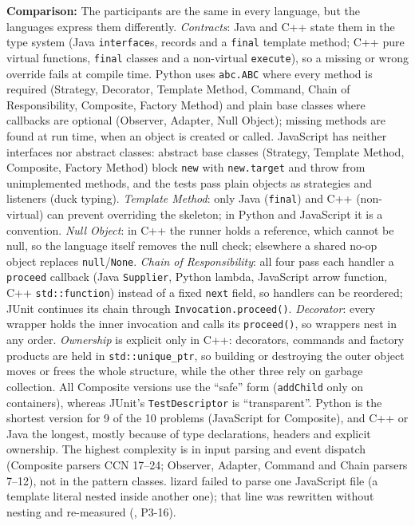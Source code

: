 \documentclass[11pt,a4paper]{article}
\newcommand{\entry}[1]{\textbf{#1:} }
\begin{document}
\entry{Comparison}The participants are the same in every language, but the languages express them differently. \emph{Contracts}: Java and C++ state them in the type system (Java \texttt{interface}s, records and a \texttt{final} template method; C++ pure virtual functions, \texttt{final} classes and a non-virtual \texttt{execute}), so a missing or wrong override fails at compile time. Python uses \texttt{abc.ABC} where every method is required (Strategy, Decorator, Template Method, Command, Chain of Responsibility, Composite, Factory Method) and plain base classes where callbacks are optional (Observer, Adapter, Null Object); missing methods are found at run time, when an object is created or called. JavaScript has neither interfaces nor abstract classes: abstract base classes (Strategy, Template Method, Composite, Factory Method) block \texttt{new} with \texttt{new.target} and throw from unimplemented methods, and the tests pass plain objects as strategies and listeners (duck typing). \emph{Template Method}: only Java (\texttt{final}) and C++ (non-virtual) can prevent overriding the skeleton; in Python and JavaScript it is a convention. \emph{Null Object}: in C++ the runner holds a reference, which cannot be null, so the language itself removes the null check; elsewhere a shared no-op object replaces \texttt{null}/\texttt{None}. \emph{Chain of Responsibility}: all four pass each handler a \texttt{proceed} callback (Java \texttt{Supplier}, Python lambda, JavaScript arrow function, C++ \texttt{std::function}) instead of a fixed \texttt{next} field, so handlers can be reordered; JUnit continues its chain through \texttt{Invocation.proceed()}. \emph{Decorator}: every wrapper holds the inner invocation and calls its \texttt{proceed()}, so wrappers nest in any order. \emph{Ownership} is explicit only in C++: decorators, commands and factory products are held in \texttt{std::unique\_ptr}, so building or destroying the outer object moves or frees the whole structure, while the other three rely on garbage collection. All Composite versions use the ``safe'' form (\texttt{addChild} only on containers), whereas JUnit's \texttt{TestDescriptor} is ``transparent''. Python is the shortest version for 9 of the 10 problems (JavaScript for Composite), and C++ or Java the longest, mostly because of type declarations, headers and explicit ownership. The highest complexity is in input parsing and event dispatch (Composite parsers CCN 17--24; Observer, Adapter, Command and Chain parsers 7--12), not in the pattern classes. lizard failed to parse one JavaScript file (a template literal nested inside another one); that line was rewritten without nesting and re-measured (, P3-16).
\end{document}
